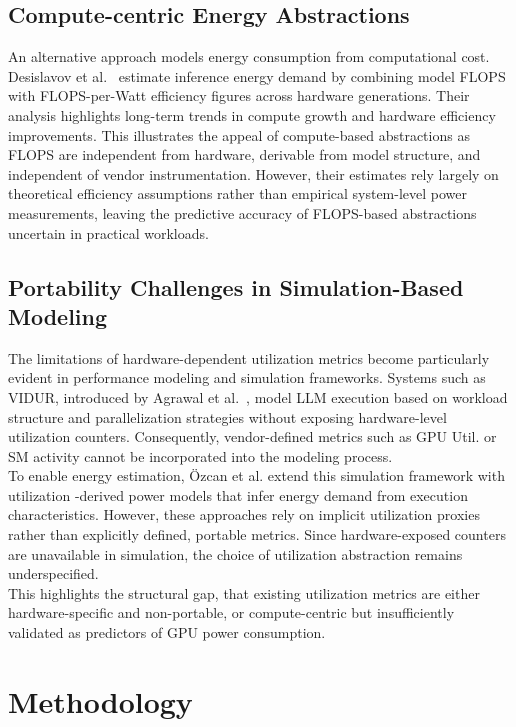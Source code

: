\documentclass[runningheads]{llncs}
\begin{document}
\subsection{Compute-centric Energy Abstractions}
An alternative approach models energy consumption from computational cost. Desislavov et al.~\cite{desislavov-2023} estimate inference energy demand by combining model FLOPS with FLOPS-per-Watt efficiency figures across hardware generations. Their analysis highlights long-term trends in compute growth and hardware efficiency improvements. This illustrates the appeal of compute-based abstractions as FLOPS are independent from hardware, derivable from model structure, and independent of vendor instrumentation. However, their estimates rely largely on theoretical efficiency assumptions rather than empirical system-level power measurements, leaving the predictive accuracy of FLOPS-based abstractions uncertain in practical workloads.

\subsection{Portability Challenges in Simulation-Based Modeling}
The limitations of hardware-dependent utilization metrics become particularly evident in performance modeling and simulation frameworks. Systems such as VIDUR, introduced by Agrawal et al.~\cite{agrawal-2025}, model LLM execution based on workload structure and parallelization strategies without exposing hardware-level utilization counters. Consequently, vendor-defined metrics such as GPU Util. or SM activity cannot be incorporated into the modeling process.\\
To enable energy estimation, Özcan et al. extend this simulation framework with utilization -derived power models that infer energy demand from execution characteristics. However, these approaches rely on implicit utilization proxies rather than explicitly defined, portable metrics. Since hardware-exposed counters are unavailable in simulation, the choice of utilization abstraction remains underspecified.\\

This highlights the structural gap, that existing utilization metrics are either hardware-specific and non-portable, or compute-centric but insufficiently validated as predictors of GPU power consumption.


\section{Methodology}\label{methodology}
\end{document}
